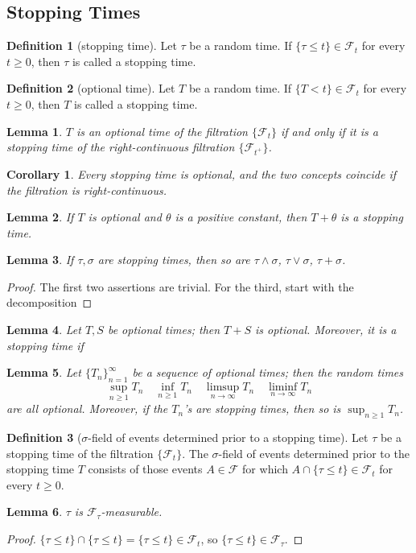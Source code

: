 \documentclass{article}
\newtheorem{Cor}{Corollary}[Thm]
\newtheorem{Lem}{Lemma}[section]
\theoremstyle{definition}
\newtheorem{Def}{Definition}[section]
\begin{document}
\subsection{Stopping Times}
\begin{Def}[stopping time]
    Let $\tau$ be a random time. If $\{\tau\le t\}\in\mathcal{F}_t$ for every $t\ge 0$,
    then $\tau$ is called a stopping time.
\end{Def}
\begin{Def}[optional time]
    Let $T$ be a random time. If $\{T<t\}\in\mathcal{F}_t$ for every $t\ge 0$,
    then $T$ is called a stopping time.
\end{Def}
\begin{Lem}
    $T$ is an optional time of the filtration $\{\mathcal{F}_t\}$ if and only if it is a stopping time of the right-continuous
    filtration $\{\mathcal{F}_{t^+}\}$.
\end{Lem}
\begin{Cor}
    Every stopping time is optional, and the two concepts coincide if the filtration is right-continuous.
\end{Cor}
\begin{Lem}
    If $T$ is optional and $\theta$ is a positive constant, then $T+\theta$ is a stopping time.
\end{Lem}
\begin{Lem}
    If $\tau,\sigma$ are stopping times, then so are $\tau\wedge \sigma$, $\tau\vee \sigma$, $\tau+\sigma$.
\end{Lem}
\begin{proof}
    The first two assertions are trivial. \newline 
    For the third, start with the decomposition
\end{proof}
\begin{Lem}
    Let $T,S$ be optional times; then $T+S$ is optional. \newline
    Moreover, it is a stopping time if
\end{Lem}
\begin{Lem}
    Let $\{T_n\}_{n=1}^\infty$ be a sequence of optional times; then the random times 
    \[\sup_{n\ge 1}T_n\quad \inf_{n\ge 1}T_n\quad \limsup_{n\to\infty}T_n\quad \liminf_{n\to\infty}T_n \] 
    are all optional.\newline 
    Moreover, if the $T_n$'s are stopping times, then so is $\sup_{n\ge 1}T_n$.
\end{Lem}


\begin{Def}[$\sigma$-field of events determined prior to a stopping time]
    Let $\tau$ be a stopping time of the filtration $\{\mathcal{F}_t\}$. The $\sigma$-field of events determined prior to the stopping time $T$
    consists of those events $A\in\mathcal{F}$ for which $A\cap\{\tau\le t\}\in \mathcal{F}_t$ for every $t\ge 0$.
\end{Def}
\begin{Lem}
    $\tau$ is $\mathcal{F}_\tau$-measurable.
\end{Lem}
\begin{proof}
    $\{\tau\le t\}\cap\{\tau\le t\}=\{\tau\le t\}\in\mathcal{F}_t$, so $\{\tau\le t\}\in \mathcal{F}_\tau$.
\end{proof}
\end{document}
